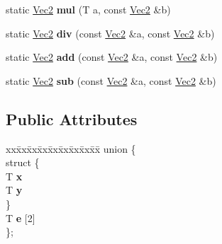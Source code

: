 \begin{DoxyCompactItemize}
\item 
\hypertarget{classps_1_1base_1_1Vec2_a2862585bbabc1dfc94ab5caa17fdb8ac}{}static \hyperlink{classps_1_1base_1_1Vec2}{Vec2} {\bfseries mul} (T a, const \hyperlink{classps_1_1base_1_1Vec2}{Vec2} \&b)\label{classps_1_1base_1_1Vec2_a2862585bbabc1dfc94ab5caa17fdb8ac}

\item 
\hypertarget{classps_1_1base_1_1Vec2_a1a8658ac54a6a8bf7e9b6ebad0b96d44}{}static \hyperlink{classps_1_1base_1_1Vec2}{Vec2} {\bfseries div} (const \hyperlink{classps_1_1base_1_1Vec2}{Vec2} \&a, const \hyperlink{classps_1_1base_1_1Vec2}{Vec2} \&b)\label{classps_1_1base_1_1Vec2_a1a8658ac54a6a8bf7e9b6ebad0b96d44}

\item 
\hypertarget{classps_1_1base_1_1Vec2_aa235a752fca07b2c39add98d85514a2a}{}static \hyperlink{classps_1_1base_1_1Vec2}{Vec2} {\bfseries add} (const \hyperlink{classps_1_1base_1_1Vec2}{Vec2} \&a, const \hyperlink{classps_1_1base_1_1Vec2}{Vec2} \&b)\label{classps_1_1base_1_1Vec2_aa235a752fca07b2c39add98d85514a2a}

\item 
\hypertarget{classps_1_1base_1_1Vec2_ae170b94905bc65cf24725402a4784062}{}static \hyperlink{classps_1_1base_1_1Vec2}{Vec2} {\bfseries sub} (const \hyperlink{classps_1_1base_1_1Vec2}{Vec2} \&a, const \hyperlink{classps_1_1base_1_1Vec2}{Vec2} \&b)\label{classps_1_1base_1_1Vec2_ae170b94905bc65cf24725402a4784062}

\end{DoxyCompactItemize}
\subsection*{Public Attributes}
\begin{DoxyCompactItemize}
\item 
\hypertarget{classps_1_1base_1_1Vec2_aece5b9f2ca01d0af0c625b1a8851b5a9}{}\begin{tabbing}
xx\=xx\=xx\=xx\=xx\=xx\=xx\=xx\=xx\=\kill
union \{\\
\hypertarget{unionps_1_1base_1_1Vec2_1_1_0D5_a9fef6c8c4ea2736427b0aeba40820d3f}{}\>struct \{\\
\>\>T {\bfseries x}\\
\>\>T {\bfseries y}\\
\>\} \label{unionps_1_1base_1_1Vec2_1_1_0D5_a9fef6c8c4ea2736427b0aeba40820d3f}
\\
\>T {\bfseries e} \mbox{[}2\mbox{]}\\
\}; \label{classps_1_1base_1_1Vec2_aece5b9f2ca01d0af0c625b1a8851b5a9}
\\

\end{tabbing}\end{DoxyCompactItemize}


